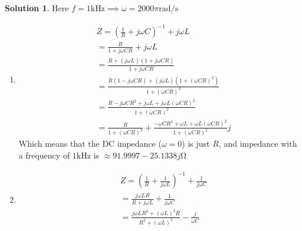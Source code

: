 \documentclass[10pt]{article}
\theoremstyle{definition}
\newtheorem{soln}{Solution}
\begin{document}
\begin{soln} Here $f=1\unit{\kilo\hertz}\implies \omega=2000\pi\unit{\radian\per\second}$
  \begin{enumerate}[label=(\alph*)]
    \item
          \begin{align*}
             & Z = \left(\frac{1}{R}+j\omega C\right)^{-1}+j\omega L                                                                             \\
             & = \frac{R}{1+j\omega CR}+j\omega L                                                                                                \\
             & = \frac{R+\left(j\omega L\right)\left(1+j\omega CR\right)}{1+j\omega CR}                                                          \\
             & = \frac{R\left(1-j\omega CR\right)+\left(j\omega L\right)\left(1+\left(\omega CR\right)^2\right)}{1+\left(\omega CR\right)^2}     \\
             & = \frac{R-j\omega CR^2+j\omega L+j\omega L\left(\omega CR\right)^2}{1+\left(\omega CR\right)^2}                                   \\
             & = \frac{R}{1+\left(\omega CR\right)^2}+\frac{-\omega CR^2+\omega L+\omega L\left(\omega CR\right)^2}{1+\left(\omega CR\right)^2}j
          \end{align*}
          Which means that the DC impedance ($\omega=0$) is just $R$, and impedance with a frequency of $1\unit{\kilo\hertz}$
          is $\approx91.9997-25.1338j\unit\ohm$
    \item
          \begin{align*}
             & Z=\left(\frac{1}{R}+\frac{1}{j\omega L}\right)^{-1}+\frac{1}{j\omega C}                                                                                                                                                                                                \\
             & =\frac{j\omega LR}{R+j\omega L}+\frac{1}{j\omega C}                                                                                                                                                                                                                    \\
             & =\frac{j\omega LR^2+\left(\omega L\right)^2R}{R^2+\left(\omega L\right)^2}-\frac{j}{\omega C}                                                                                                                                                                          \\

\end{align*}
\end{enumerate}
\end{soln}
\end{document}
